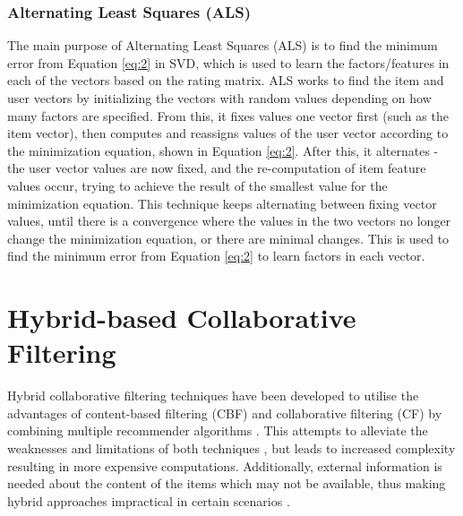 \subsubsection{Alternating Least Squares (ALS)} \label{als}

The main purpose of Alternating Least Squares (ALS) is to find the minimum error from Equation \ref{eq:2} in SVD, which is used to learn the factors/features in each of the vectors based on the rating matrix. ALS works to find the item and user vectors by initializing the vectors with random values depending on how many factors are specified. From this, it fixes values one vector first (such as the item vector), then computes and reassigns values of the user vector according to the minimization equation, shown in Equation \ref{eq:2}. After this, it alternates - the user vector values are now fixed, and the re-computation of item feature values occur, trying to achieve the result of the smallest value for the minimization equation. This technique keeps alternating between fixing vector values, until there is a convergence where the values in the two vectors no longer change the minimization equation, or there are minimal changes. This is used to find the minimum error from Equation \ref{eq:2} to learn factors in each vector. 

\section{Hybrid-based Collaborative Filtering}


Hybrid collaborative filtering techniques have been developed to utilise the advantages of content-based filtering (CBF) and collaborative filtering (CF) by combining multiple recommender algorithms \cite{toward, spiegel2010hybrid}. This attempts to alleviate the weaknesses and limitations of both techniques \cite{toward, spiegel2010hybrid}, but leads to increased complexity resulting in more expensive computations. Additionally, external information is needed about the content of the items which may not be available, thus making hybrid approaches impractical in certain scenarios \cite{survey}. 

